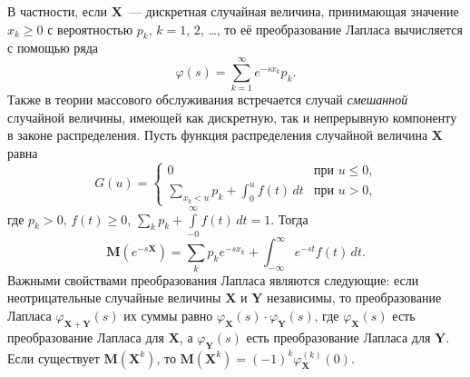 \documentclass[12pt]{extarticle}
\newcommand{\M}{{\mathbf M}}
\begin{document}
В частности, если $\boldsymbol{X}$~--- дискретная случайная величина,
принимающая значение $x_k\geqslant0$ с вероятностью $p_k$, $k=1$, $2$, \ldots{},
то её преобразование Лапласа вычисляется с помощью ряда
\[
\varphi(s)=\sum_{k=1}^\infty e^{-s x_k} p_k.
\]
Также в теории массового обслуживания встречается случай \emph{смешанной}
случайной величины, имеющей как дискретную, так и непрерывную компоненту в законе
распределения. Пусть функция распределения случайной величина $\boldsymbol{X}$
равна
\enlargethispage{3ex}
\[
G(u)=\begin{cases}
  0 & \text{при $u\leqslant0$,}\\
\displaystyle  \sum_{x_k<u} p_k + \int_{0}^u f(t)\,dt  & \text{при $u>0$,}
\end{cases}
\]
где $p_k>0$, $f(t)\geqslant0$, $\sum\limits_{k}p_k+\int\limits_{-0}^\infty
f(t)\,dt=1$. Тогда 
\[
\M(e^{-s\boldsymbol{X}})=\sum_{k}p_ke^{-s x_k}+\int_{-\infty}^\infty e^{-st}
f(t)\,dt.
\]
Важными свойствами преобразования Лапласа являются следующие: если
неотрицательные случайные величины $\boldsymbol{X}$ и $\boldsymbol Y$
независимы, то преобразование Лапласа
$\varphi_{\boldsymbol{X}+\boldsymbol{Y}}(s)$ их суммы равно
$\varphi_{\boldsymbol{X}}(s)\cdot\varphi_{\boldsymbol{Y}}(s)$, где
$\varphi_{\boldsymbol{X}}(s)$ есть преобразование Лапласа для $\boldsymbol{X}$,
а $\varphi_{\boldsymbol{Y}}(s)$ есть преобразование Лапласа для
$\boldsymbol{Y}$. Если существует $\M(\boldsymbol{X}^k)$, то $\M(\boldsymbol{X}^k)=(-1)^k\varphi_{\boldsymbol{X}}^{(k)}(0)$.
\end{document}
